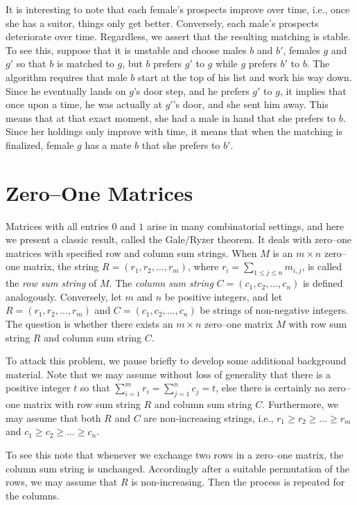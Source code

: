 It is interesting to note that each female's prospects improve over time, i.e.,
once she has a suitor, things only get better.  Conversely, each male's
prospects deteriorate over time.  Regardless, we assert that the resulting
matching is stable.  To see this, suppose that it is unstable and
choose males $b$ and $b'$, females $g$ and $g'$ so that $b$ is matched
to $g$, but $b$ prefers $g'$ to $g$ while $g$ prefers $b'$ to $b$.  The
algorithm requires that male $b$ start at the top of his list and
work his way down.  Since he eventually lands on $g$'s door step, and
he prefers $g'$ to $g$, it implies that once upon a time, he was
actually at $g'$'s door, and she sent him away.  This means that at that
exact moment, she had a male in hand that she prefers to $b$.  Since
her holdings only improve with time, it means that when the matching
is finalized, female $g$ has a mate $b$ that she prefers to $b'$.

\section{Zero--One Matrices}

Matrices with all entries $0$ and $1$ arise in many combinatorial
settings, and here we present a classic result, called the Gale/Ryzer
theorem.  It deals with zero--one matrices with specified row and
column sum strings.  When $M$ is an $m\times n$ zero--one matrix, the
string $R=(r_1,r_2,\dots,r_m)$, where $r_i=\sum_{1\le j\le n}m_{i,j}$,
is called the \textit{row sum string} of $M$. The \textit{column sum string}
$C=(c_1,c_2,\dots,c_n)$ is defined analogously.  Conversely,  let $m$ 
and $n$ be positive integers, and let $R=(r_1,r_2,\dots,r_m)$ and 
$C=(c_1,c_2,\dots,c_n)$ be strings of non-negative integers.  The 
question is whether there exists an $m\times n$ zero--one matrix 
$M$ with row sum string $R$ and column sum string $C$.

To attack this problem, we pause briefly to develop some additional
background material.  Note that we may assume without loss of
generality that there is a positive integer $t$ so that 
$\sum_{i=1}^mr_i=\sum_{j=1}^nc_j=t$, else there is certainly
no zero--one matrix with row sum string $R$ and column sum string $C$.
Furthermore, we may assume that both $R$ and $C$ are non-increasing strings, 
i.e., $r_1\ge r_2\ge \dots\ge r_m$ and $c_1\ge c_2\ge\dots\ge c_n$.  

To see this note that whenever we exchange two rows in a zero--one matrix,
the column sum string is unchanged.   Accordingly after a suitable
permutation of the rows, we may assume that $R$ is non-increasing.
Then the process is repeated for the columns.


